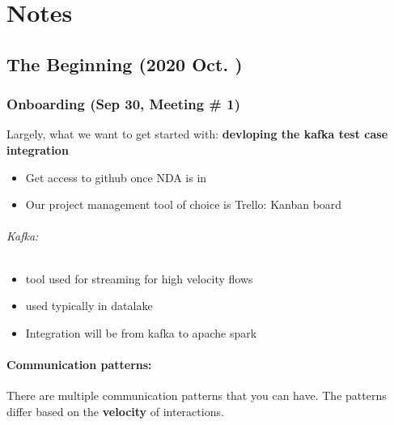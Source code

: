 \part{Notes}

\chapter{The Beginning (2020 Oct. )}

\section{Onboarding (Sep 30, Meeting \# 1)}

Largely, what we want to get started with: \textbf{devloping the kafka test case integration}

\begin{itemize}
\item Get access to github once NDA is in
\item Our project management tool of choice is Trello: Kanban board
\end{itemize}



\paragraph*{Kafka:}
\begin{itemize}
\item tool used for streaming for high velocity flows
\item used typically in datalake
\item Integration will be from kafka to apache spark
\end{itemize}

\subsection*{Communication patterns:}
There are multiple communication patterns that you can have. The patterns differ based on the \textbf{velocity} of interactions.

